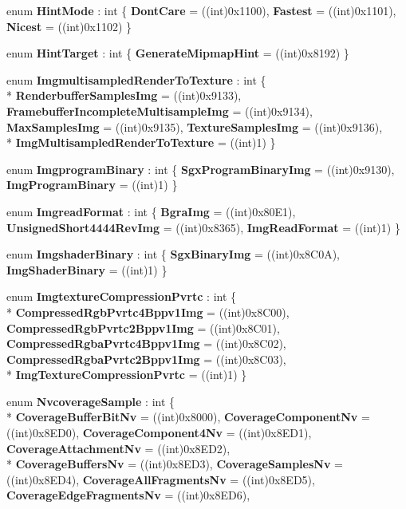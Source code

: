 \begin{DoxyCompactItemize}
enum {\bfseries Hint\-Mode} \-: int \{ {\bfseries Dont\-Care} = ((int)0x1100), 
{\bfseries Fastest} = ((int)0x1101), 
{\bfseries Nicest} = ((int)0x1102)
 \}
\item 
enum {\bfseries Hint\-Target} \-: int \{ {\bfseries Generate\-Mipmap\-Hint} = ((int)0x8192)
 \}
\item 
enum {\bfseries Imgmultisampled\-Render\-To\-Texture} \-: int \{ \\*
{\bfseries Renderbuffer\-Samples\-Img} = ((int)0x9133), 
{\bfseries Framebuffer\-Incomplete\-Multisample\-Img} = ((int)0x9134), 
{\bfseries Max\-Samples\-Img} = ((int)0x9135), 
{\bfseries Texture\-Samples\-Img} = ((int)0x9136), 
\\*
{\bfseries Img\-Multisampled\-Render\-To\-Texture} = ((int)1)
 \}
\item 
enum {\bfseries Imgprogram\-Binary} \-: int \{ {\bfseries Sgx\-Program\-Binary\-Img} = ((int)0x9130), 
{\bfseries Img\-Program\-Binary} = ((int)1)
 \}
\item 
enum {\bfseries Imgread\-Format} \-: int \{ {\bfseries Bgra\-Img} = ((int)0x80\-E1), 
{\bfseries Unsigned\-Short4444\-Rev\-Img} = ((int)0x8365), 
{\bfseries Img\-Read\-Format} = ((int)1)
 \}
\item 
enum {\bfseries Imgshader\-Binary} \-: int \{ {\bfseries Sgx\-Binary\-Img} = ((int)0x8\-C0\-A), 
{\bfseries Img\-Shader\-Binary} = ((int)1)
 \}
\item 
enum {\bfseries Imgtexture\-Compression\-Pvrtc} \-: int \{ \\*
{\bfseries Compressed\-Rgb\-Pvrtc4\-Bppv1\-Img} = ((int)0x8\-C00), 
{\bfseries Compressed\-Rgb\-Pvrtc2\-Bppv1\-Img} = ((int)0x8\-C01), 
{\bfseries Compressed\-Rgba\-Pvrtc4\-Bppv1\-Img} = ((int)0x8\-C02), 
{\bfseries Compressed\-Rgba\-Pvrtc2\-Bppv1\-Img} = ((int)0x8\-C03), 
\\*
{\bfseries Img\-Texture\-Compression\-Pvrtc} = ((int)1)
 \}
\item 
enum {\bfseries Nvcoverage\-Sample} \-: int \{ \\*
{\bfseries Coverage\-Buffer\-Bit\-Nv} = ((int)0x8000), 
{\bfseries Coverage\-Component\-Nv} = ((int)0x8\-E\-D0), 
{\bfseries Coverage\-Component4\-Nv} = ((int)0x8\-E\-D1), 
{\bfseries Coverage\-Attachment\-Nv} = ((int)0x8\-E\-D2), 
\\*
{\bfseries Coverage\-Buffers\-Nv} = ((int)0x8\-E\-D3), 
{\bfseries Coverage\-Samples\-Nv} = ((int)0x8\-E\-D4), 
{\bfseries Coverage\-All\-Fragments\-Nv} = ((int)0x8\-E\-D5), 
{\bfseries Coverage\-Edge\-Fragments\-Nv} = ((int)0x8\-E\-D6), 

\end{DoxyCompactItemize}

